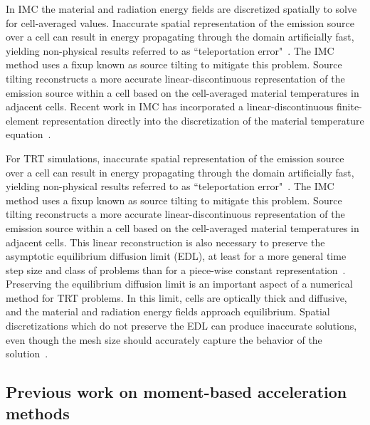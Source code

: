 In IMC the material and radiation energy fields are discretized spatially to solve for cell-averaged values.
Inaccurate spatial representation of the emission source over a cell can result in
energy propagating through the domain artificially fast, yielding non-physical
results referred to as ``teleportation error"~\cite{teleportation}.  The IMC method uses a fixup known as source tilting
to mitigate this problem.  Source tilting reconstructs a more accurate
linear-discontinuous representation of the
emission source within a cell based on the cell-averaged material temperatures in adjacent
cells.  Recent work in IMC has incorporated a linear-discontinuous finite-element representation directly into 
the discretization of the material temperature equation~\cite{wollaeger_ld}.



For TRT simulations, inaccurate spatial representation of the emission source over a cell can result in
energy propagating through the domain artificially fast, yielding non-physical
results referred to as ``teleportation error"~\cite{teleportation}.  The IMC method uses a fixup known as source tilting
to mitigate this problem.  Source tilting reconstructs a more accurate
linear-discontinuous representation of the
emission source within a cell based on the cell-averaged material temperatures in adjacent
cells. This linear reconstruction is also necessary to preserve the asymptotic equilibrium diffusion
limit (EDL), at least for a more general time step size and class of problems than for a piece-wise constant representation~\cite{diff_limit_imc}.  Preserving the equilibrium diffusion limit is an
important aspect of a numerical method for TRT problems. 
In this limit, cells are optically thick and diffusive, and the material
and radiation energy fields approach equilibrium.
Spatial discretizations which do not preserve the EDL can produce inaccurate
solutions, even though the mesh size should accurately capture the behavior of the solution~\cite{morel_ldtrt}.

\subsection{Previous work on moment-based acceleration methods}

